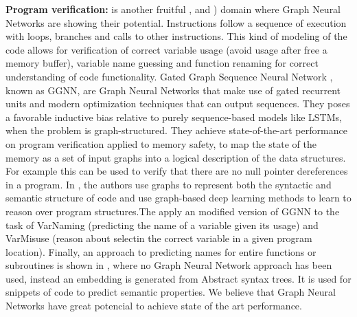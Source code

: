 \textbf{Program verification:} is another fruitful \cite{ggnn}, \cite{139} and \cite{code2vec}) domain where Graph Neural Networks are showing their potential. Instructions follow a sequence of execution with loops, branches and calls to other instructions. This kind of modeling of the code allows for verification of correct variable usage (avoid usage after free a memory buffer), variable name guessing and function renaming for correct understanding of code functionality. Gated Graph Sequence Neural Network \cite{ggnn}, known as GGNN, are Graph Neural Networks that make use of gated recurrent units and modern optimization techniques that can output sequences. They poses a favorable inductive bias relative to purely sequence-based models like LSTMs, when the problem is graph-structured. They achieve state-of-the-art performance on program verification applied to memory safety, to map the state of the memory as a set of input graphs into a logical description of the data structures. For example this can be used to verify that there are no null pointer dereferences in a program. In \cite{139}, the authors use graphs to represent both the syntactic and semantic structure of code and use graph-based deep learning methods to learn to reason over program structures.The apply an modified version of GGNN to the task of VarNaming (predicting the name of a variable given its usage) and VarMisuse (reason about selectin the correct variable in a given program location). Finally, an approach to predicting names for entire functions or subroutines is shown in \cite{code2vec}, where no Graph Neural Network approach has been used, instead an embedding is generated from Abstract syntax trees. It is used for snippets of code to predict semantic properties. We believe that Graph Neural Networks have great potencial to achieve state of the art performance.






